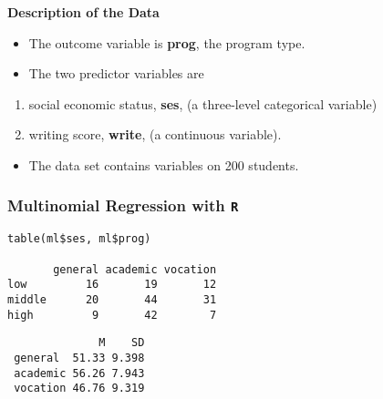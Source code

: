 \documentclass[00-GLMregslides.tex]{subfiles}
\begin{document}
% 


%
 
 
\begin{frame}[fragile]
\Large	
	\textbf{Description of the Data}
\begin{itemize}
\item The outcome variable is \textbf{prog}, the program type. 
\item The two predictor variables are
\end{itemize}
{ \Large
\begin{enumerate}
 \item social economic status, \textbf{ses}, (a three-level categorical variable) 
 \item writing score, \textbf{write}, (a continuous variable).
\end{enumerate} 
}
\begin{itemize}
\item The data set contains variables on 200 students.
\end{itemize}
\end{frame} 
\begin{frame}[fragile]
\Large
\frametitle{Multinomial Regression with \texttt{R}}
\Large
\begin{framed}
\begin{verbatim}
table(ml$ses, ml$prog)

       general academic vocation
low         16       19       12
middle      20       44       31
high         9       42        7
\end{verbatim} 
\end{framed}
\begin{verbatim} 
              M    SD
 general  51.33 9.398
 academic 56.26 7.943
 vocation 46.76 9.319
\end{verbatim} 

\end{frame}
\end{document}
